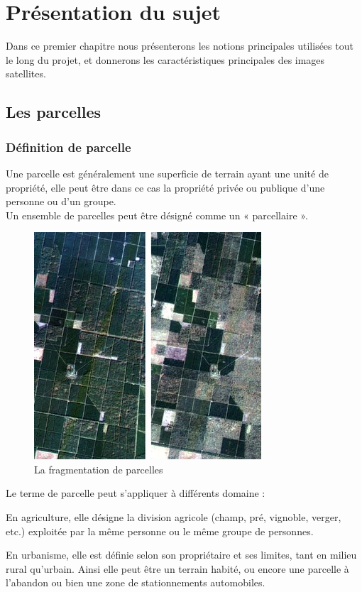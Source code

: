 \documentclass[12pt, openany]{report}
\begin{document}
\chapter{Présentation du sujet}


Dans ce premier chapitre nous présenterons les notions principales utilisées tout le long du projet, et donnerons les caractéristiques principales des images satellites.


\newpage
\section{Les parcelles}

\subsection{Définition de parcelle}
Une parcelle est généralement une superficie de terrain ayant une unité de propriété, elle peut être dans ce cas la propriété privée ou publique d'une personne ou d'un groupe.\\
Un ensemble de parcelles peut être désigné comme un « parcellaire ». 

\begin{figure}[H]
\centering
\includegraphics[scale=0.7]{seg.jpg}
\caption{La fragmentation de parcelles}
\end{figure}


Le terme de parcelle peut s'appliquer à différents domaine :

\begin{mylist}

\item En agriculture, elle désigne la division agricole (champ, pré, vignoble, verger, etc.) exploitée par la même personne ou le même groupe de personnes.


\item En urbanisme, elle est définie selon son propriétaire et ses limites, tant en milieu rural qu'urbain. Ainsi elle peut être un terrain habité, ou encore une parcelle à l'abandon ou bien une zone de stationnements automobiles. 

\end{mylist}
\end{document}
